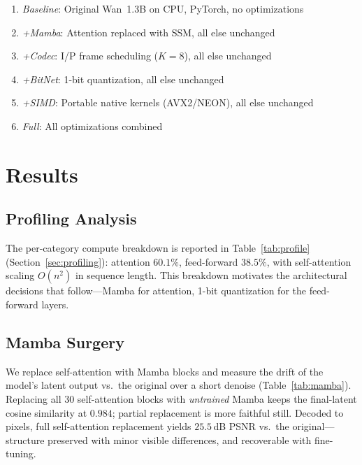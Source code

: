 \documentclass[11pt]{article}
\begin{document}
\begin{enumerate}[leftmargin=2em, itemsep=0.1em]
  \item \emph{Baseline}: Original Wan~1.3B on CPU, PyTorch, no optimizations
  \item \emph{+Mamba}: Attention replaced with SSM, all else unchanged
  \item \emph{+Codec}: I/P frame scheduling ($K=8$), all else unchanged
  \item \emph{+BitNet}: 1-bit quantization, all else unchanged
  \item \emph{+SIMD}: Portable native kernels (AVX2/NEON), all else unchanged
  \item \emph{Full}: All optimizations combined
\end{enumerate}


\section{Results}

\subsection{Profiling Analysis}

The per-category compute breakdown is reported in Table~\ref{tab:profile}
(Section~\ref{sec:profiling}): attention $60.1\%$, feed-forward $38.5\%$, with
self-attention scaling $O(n^2)$ in sequence length. This breakdown motivates the
architectural decisions that follow---Mamba for attention, 1-bit quantization
for the feed-forward layers.

\subsection{Mamba Surgery}

We replace self-attention with Mamba blocks and measure the drift of the model's
latent output vs.\ the original over a short denoise (Table~\ref{tab:mamba}).
Replacing all 30 self-attention blocks with \emph{untrained} Mamba keeps the
final-latent cosine similarity at $0.984$; partial replacement is more faithful
still. Decoded to pixels, full self-attention replacement yields $25.5$\,dB PSNR
vs.\ the original---structure preserved with minor visible differences, and
recoverable with fine-tuning.
\end{document}
